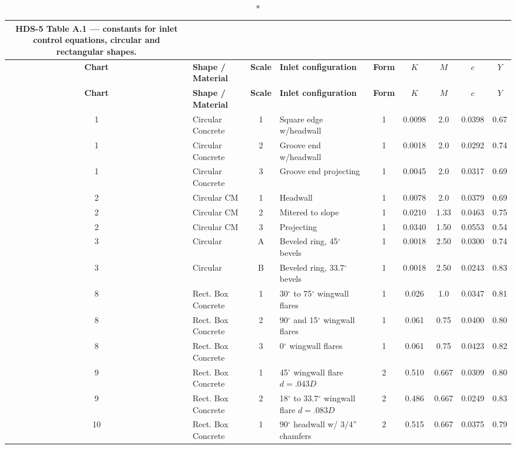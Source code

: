 \documentclass[11pt,a4paper]{article}
\begin{document}
\begin{landscape}
\begingroup
\setlength{\LTleft}{\fill}\setlength{\LTright}{\fill}
\begin{longtable}{@{}clcp{}ccccc@{}}
\caption*{\textbf{HDS-5 Table A.1} --- constants for inlet control equations, circular and rectangular shapes.}\\
\toprule
\textbf{Chart} & \textbf{Shape / Material} & \textbf{Scale} & \textbf{Inlet configuration}
 & \textbf{Form} & $K$ & $M$ & $c$ & $Y$\\
\midrule
\endfirsthead
\toprule
\textbf{Chart} & \textbf{Shape / Material} & \textbf{Scale} & \textbf{Inlet configuration}
 & \textbf{Form} & $K$ & $M$ & $c$ & $Y$\\
\midrule
\endhead
1 & Circular Concrete & 1 & Square edge w/headwall & 1 & 0.0098 & 2.0 & 0.0398 & 0.67\\
1 & Circular Concrete & 2 & Groove end w/headwall & 1 & 0.0018 & 2.0 & 0.0292 & 0.74\\
1 & Circular Concrete & 3 & Groove end projecting & 1 & 0.0045 & 2.0 & 0.0317 & 0.69\\
2 & Circular CM & 1 & Headwall & 1 & 0.0078 & 2.0 & 0.0379 & 0.69\\
2 & Circular CM & 2 & Mitered to slope & 1 & 0.0210 & 1.33 & 0.0463 & 0.75\\
2 & Circular CM & 3 & Projecting & 1 & 0.0340 & 1.50 & 0.0553 & 0.54\\
3 & Circular & A & Beveled ring, 45$^\circ$ bevels & 1 & 0.0018 & 2.50 & 0.0300 & 0.74\\
3 & Circular & B & Beveled ring, 33.7$^\circ$ bevels & 1 & 0.0018 & 2.50 & 0.0243 & 0.83\\
8 & Rect. Box Concrete & 1 & 30$^\circ$ to 75$^\circ$ wingwall flares & 1 & 0.026 & 1.0 & 0.0347 & 0.81\\
8 & Rect. Box Concrete & 2 & 90$^\circ$ and 15$^\circ$ wingwall flares & 1 & 0.061 & 0.75 & 0.0400 & 0.80\\
8 & Rect. Box Concrete & 3 & 0$^\circ$ wingwall flares & 1 & 0.061 & 0.75 & 0.0423 & 0.82\\
9 & Rect. Box Concrete & 1 & 45$^\circ$ wingwall flare $d=.043D$ & 2 & 0.510 & 0.667 & 0.0309 & 0.80\\
9 & Rect. Box Concrete & 2 & 18$^\circ$ to 33.7$^\circ$ wingwall flare $d=.083D$ & 2 & 0.486 & 0.667 & 0.0249 & 0.83\\
10 & Rect. Box Concrete & 1 & 90$^\circ$ headwall w/ 3/4'' chamfers & 2 & 0.515 & 0.667 & 0.0375 & 0.79\\

\end{longtable}
\end{landscape}
\end{document}
